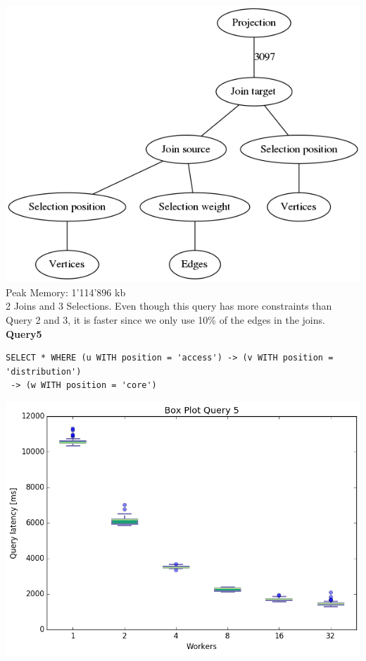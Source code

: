 \documentclass[11pt,singlecolumn]{scrartcl}
\begin{document}
\includegraphics[width=1\textwidth]{graph4}
Peak Memory: 1'114'896 kb \\
2 Joins and 3 Selections. Even though this query has more constraints than Query 2 and 3, it is faster since we only use 10\% of the edges in the joins. 
\clearpage
\textbf{Query5}\\
\begin{verbatim}
SELECT * WHERE (u WITH position = 'access') -> (v WITH position = 'distribution')
 -> (w WITH position = 'core')\end{verbatim}
\includegraphics[width=1\textwidth]{box/q5}
\end{document}
